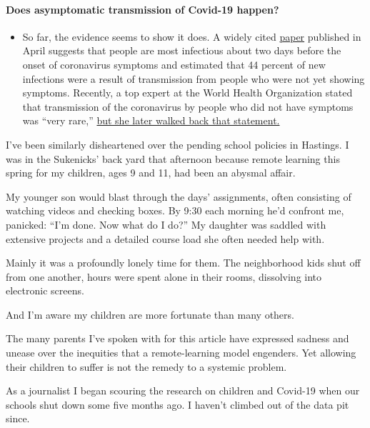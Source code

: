 \begin{itemize}
{  \paragraph{Does asymptomatic transmission of Covid-19
  happen?}\label{does-asymptomatic-transmission-of-covid-19-happen}}

  \begin{itemize}
  \tightlist
  \item
    So far, the evidence seems to show it does. A widely cited
    \href{https://www.nature.com/articles/s41591-020-0869-5}{paper}
    published in April suggests that people are most infectious about
    two days before the onset of coronavirus symptoms and estimated that
    44 percent of new infections were a result of transmission from
    people who were not yet showing symptoms. Recently, a top expert at
    the World Health Organization stated that transmission of the
    coronavirus by people who did not have symptoms was ``very rare,''
    \href{https://www.nytimes3xbfgragh.onion/2020/06/09/world/coronavirus-updates.html?action=click\&pgtype=Article\&state=default\&region=MAIN_CONTENT_3\&context=storylines_faq\#link-1f302e21}{but
    she later walked back that statement.}
  \end{itemize}
\end{itemize}

I've been similarly disheartened over the pending school policies in
Hastings. I was in the Sukenicks' back yard that afternoon because
remote learning this spring for my children, ages 9 and 11, had been an
abysmal affair.

My younger son would blast through the days' assignments, often
consisting of watching videos and checking boxes. By 9:30 each morning
he'd confront me, panicked: ``I'm done. Now what do I do?'' My daughter
was saddled with extensive projects and a detailed course load she often
needed help with.

Mainly it was a profoundly lonely time for them. The neighborhood kids
shut off from one another, hours were spent alone in their rooms,
dissolving into electronic screens.

And I'm aware my children are more fortunate than many others.

The many parents I've spoken with for this article have expressed
sadness and unease over the inequities that a remote-learning model
engenders. Yet allowing their children to suffer is not the remedy to a
systemic problem.

As a journalist I began scouring the research on children and Covid-19
when our schools shut down some five months ago. I haven't climbed out
of the data pit since.

